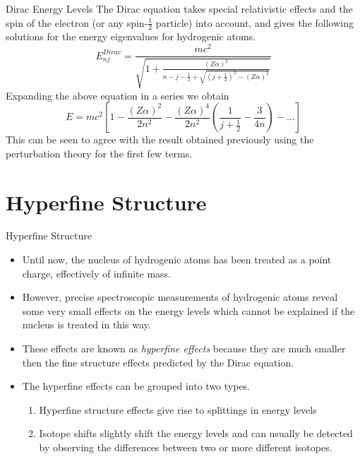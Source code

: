 \documentclass[xcolor=dvipsnames,t]{beamer}
\begin{document}
    \begin{frame}{Dirac Energy Levels} 
    The Dirac equation takes special relativistic effects and the spin of the electron
    (or any spin-$\frac{1}{2}$ particle) into account, and gives the following solutions for the energy
    eigenvalues for hydrogenic atoms.
    \begin{equation}
        E_{nj}^{Dirac} = \frac{mc^2}
        {
            \sqrt
            { 
                1 + \frac{(Z \alpha)^2}
                {
                    n - j - \frac{1}{2} +
                    \sqrt
                    {
                        \left(j + \frac{1}{2}\right)^2 - (Z \alpha)^2
                    }
                }
            }
        }
    \end{equation}
    Expanding the above equation in a series we obtain
    \begin{equation}
        E = mc^2 \left[ 
            1 - \frac{(Z\alpha)^2}{2n^2} - \frac{(Z\alpha)^4}{2n^2}
                    \left(
                        \frac{1}{j + \frac{1}{2}} - \frac{3}{4n}
                    \right)
                        - ...
                 \right]
    \end{equation}
    This can be seen to agree with the result obtained previously using the perturbation
    theory for the first few terms.
    \end{frame} 

\section{Hyperfine Structure}
    \begin{frame}{Hyperfine Structure} 
        \begin{itemize} 
            \item Until now, the nucleus of hydrogenic atoms has been treated
                as a point charge, effectively of infinite mass. 
            \item However, precise spectroscopic measurements of hydrogenic atoms reveal some very small effects on the energy levels which cannot be explained if the nucleus is treated in this way. 
            \item These effects are known as \emph{hyperfine effects} because they are much smaller then the fine
    structure effects predicted by the Dirac equation. 
\item The hyperfine effects can be grouped into two types.
    \begin{enumerate}
        \item Hyperfine structure effects give rise to splittings in energy levels
        \item Isotope shifts slightly shift the energy levels and can usually be 
              detected by observing the differences between two or more 
              different isotopes.
    \end{enumerate} 
    \end{itemize} 
\end{frame} 
\end{document}

